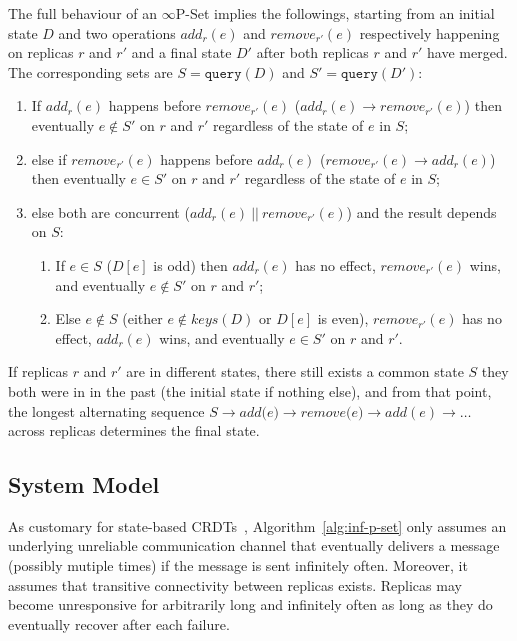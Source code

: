 \documentclass[11pt, oneside]{article}   	%
\begin{document}
The full behaviour of an $\infty$P-Set implies the followings, starting from an initial state $D$ and two operations $\textit{add}_r(e)$ and $\textit{remove}_{r'}(e)$ respectively happening on replicas $r$ and $r'$ and a final state $D'$ after both replicas $r$ and $r'$ have merged. The corresponding sets are $S=\texttt{query}(D)$ and $S'=\texttt{query}(D')$:
\begin{enumerate}
	\item If $\textit{add}_r(e)$ happens before $\textit{remove}_{r'}(e)$ ($\textit{add}_r(e)\rightarrow \textit{remove}_{r'}(e)$) then eventually $e \notin S'$ on $r$ and $r'$ regardless of the state of $e$ in $S$;
	\item else if $\textit{remove}_{r'}(e)$ happens before $\textit{add}_{r}(e)$ ($\textit{remove}_{r'}(e) \rightarrow  \textit{add}_r(e)$) then eventually $e \in S'$ on $r$ and $r'$ regardless of the state of $e$ in $S$;
	\item else both are concurrent ($add_r(e) ~||~ remove_{r'}(e)$) and the result depends on $S$:
	    \begin{enumerate}
		\item	 If $e \in S$ ($D[e]$ is odd) then $add_r(e)$ has no effect, $remove_{r'}(e)$ wins, and eventually $e \notin S'$ on $r$ and $r'$;
		\item Else $e \notin S$ (either $e \notin \textit{keys}(D)$ or $D[e]$ is even), $remove_{r'}(e)$  has no effect, $add_r(e)$ wins, and eventually $e \in S'$ on $r$ and $r'$.
	    \end{enumerate}
\end{enumerate}

If replicas $r$ and $r'$ are in different states, there still exists a common state $S$ they both were in in the past (the initial state if nothing else), and from that point, the longest alternating sequence $S \rightarrow \textit{add(e)} \rightarrow \textit{remove(e)}\rightarrow \textit{add}(e) \rightarrow \dots$ across replicas determines the final state.

\subsection{System Model}
\label{sec:system-model}

As customary for state-based CRDTs~\cite{shapiro:inria-00555588}, Algorithm~\ref{alg:inf-p-set} only assumes an underlying unreliable communication channel that eventually delivers  a message (possibly mutiple times) if the message is sent infinitely often. Moreover,  it assumes that transitive connectivity between replicas exists. Replicas may become unresponsive for arbitrarily long and infinitely often as long as they do eventually recover after each failure.
\end{document}
